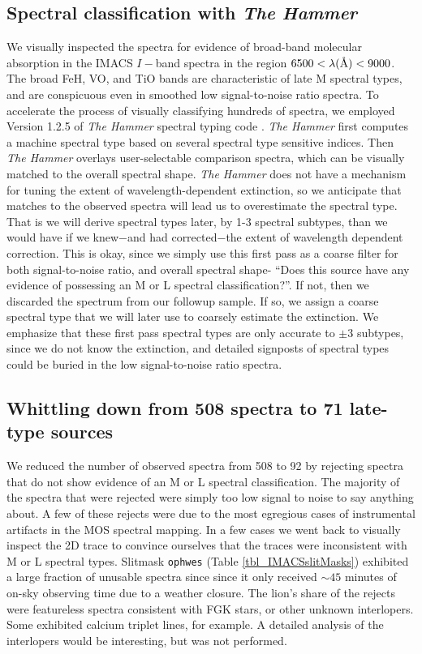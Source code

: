\documentclass[12pt,preprint]{aastex}
\newcommand{\angstrom}{\mbox{\normalfont\AA}}
\begin{document}
\subsection{Spectral classification with \emph{The Hammer}}
We visually inspected the spectra for evidence of broad-band molecular absorption in the IMACS $I-$band spectra in the region $6500<\lambda(\angstrom)<9000 $.  The broad FeH, VO, and TiO bands are characteristic of late M spectral types, and are conspicuous even in smoothed low signal-to-noise ratio spectra.  To accelerate the process of visually classifying hundreds of spectra, we employed Version 1.2.5 of \emph{The Hammer} spectral typing code \citep{2007AJ....134.2398C,2011AJ....141...97W}.  \emph{The Hammer} first computes a machine spectral type based on several spectral type sensitive indices.  Then \emph{The Hammer} overlays user-selectable comparison spectra, which can be visually matched to the overall spectral shape.  \emph{The Hammer} does not have a mechanism for tuning the extent of wavelength-dependent extinction, so we anticipate that matches to the observed spectra will lead us to overestimate the spectral type.  That is we will derive spectral types later, by 1-3 spectral subtypes, than we would have if we knew$-$and had corrected$-$the extent of wavelength dependent correction.  This is okay, since we simply use this first pass as a coarse filter for both signal-to-noise ratio, and overall spectral shape- ``Does this source have any evidence of possessing an M or L spectral classification?''.  If not, then we discarded the spectrum from our followup sample.  If so, we assign a coarse spectral type that we will later use to coarsely estimate the extinction.  We emphasize that these first pass spectral types are only accurate to $\pm3$ subtypes, since we do not know the extinction, and detailed signposts of spectral types could be buried in the low signal-to-noise ratio spectra.

\subsection{ Whittling down from 508 spectra to 71 late-type sources}
We reduced the number of observed spectra from 508 to 92 by rejecting spectra that do not show evidence of an M or L spectral classification.  The majority of the spectra that were rejected were simply too low signal to noise to say anything about.  A few of these rejects were due to the most egregious cases of instrumental artifacts in the MOS spectral mapping.  In a few cases we went back to visually inspect the 2D trace to convince ourselves that the traces were inconsistent with M or L spectral types.    Slitmask \texttt{ophwes} (Table \ref{tbl_IMACSslitMasks}) exhibited a large fraction of unusable spectra since since it only received $\sim45$ minutes of on-sky observing time due to a weather closure.  The lion's share of the rejects were featureless spectra consistent with FGK stars, or other unknown interlopers.  Some exhibited calcium triplet lines, for example.  A detailed analysis of the interlopers would be interesting, but was not performed.
\end{document}
